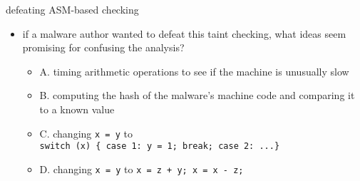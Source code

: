 \begin{frame}[fragile,label=defeatAsmCheck]{defeating ASM-based checking}
\begin{itemize}
\item if a malware author wanted to defeat this taint checking,
what ideas seem promising for confusing the analysis?
\begin{itemize}
\item A. timing arithmetic operations to see if the machine is unusually slow
\item B. computing the hash of the malware's machine code and comparing it to a known value
\item C. changing \lstinline|x = y| to \\
    \lstinline|switch (x) { case 1: y = 1; break; case 2: ...}|
\item D. changing \lstinline|x = y| to \lstinline|x = z + y; x = x - z;|
\end{itemize}
\end{itemize}
\end{frame}

